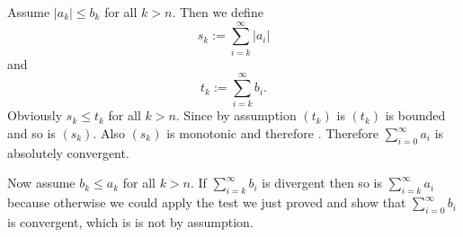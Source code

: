 \documentclass[12pt]{article}
\begin{document}
Assume $|a_k|\leq b_k$ for all $k>n$. Then we define
$$s_k:=\sum_{i=k}^\infty |a_i|$$
and
$$t_k:=\sum_{i=k}^\infty b_i.$$
Obviously $s_k\leq t_k$ for all $k>n$. Since by assumption $(t_k)$ is  $(t_k)$ is bounded and so is $(s_k)$. Also $(s_k)$ is monotonic and therefore . Therefore $\sum_{i=0}^\infty a_i$ is absolutely convergent.

Now assume $b_k\leq a_k$ for all $k>n$. If $\sum_{i=k}^\infty b_i$ is divergent then so is $\sum_{i=k}^\infty a_i$ because otherwise we could apply the test we just proved and show that $\sum_{i=0}^\infty b_i$ is convergent, which is is not by assumption.
\end{document}
